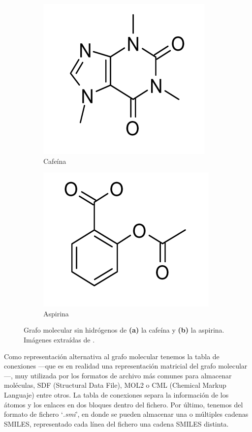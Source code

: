 \begin{figure}[h!]
\centering
\begin{subfigure}{.5\textwidth}
  \centering
  \includegraphics[width=.7\linewidth]{imagenes/estado_arte/teoria/cafeina.png}
  \caption{Cafeína}
\end{subfigure}%
\begin{subfigure}{.5\textwidth}
  \centering
  \includegraphics[width=.7\linewidth]{imagenes/estado_arte/teoria/aspirina.png}
  \caption{Aspirina}
\end{subfigure}
\caption{Grafo molecular sin hidrógenos de \textbf{(a)} la cafeína y \textbf{(b)} la aspirina. Imágenes extraídas de \cite{brown_chemoinformaticsintroduction_2009}.}
\label{fig:grafo_molecular_caf_asp}
\end{figure}


Como representación alternativa al grafo molecular tenemos la tabla de conexiones —que es en realidad una representación matricial del grafo molecular—, muy utilizada por los formatos de archivo más comunes para almacenar moléculas, SDF (Structural Data File), MOL2 o CML (Chemical Markup Languaje) entre otros. La tabla de conexiones separa la información de los átomos y los enlaces en dos bloques dentro del fichero. Por último, tenemos del formato de fichero `\textit{.smi}', en donde se pueden almacenar una o múltiples cadenas SMILES, representado cada línea del fichero una cadena SMILES distinta.

